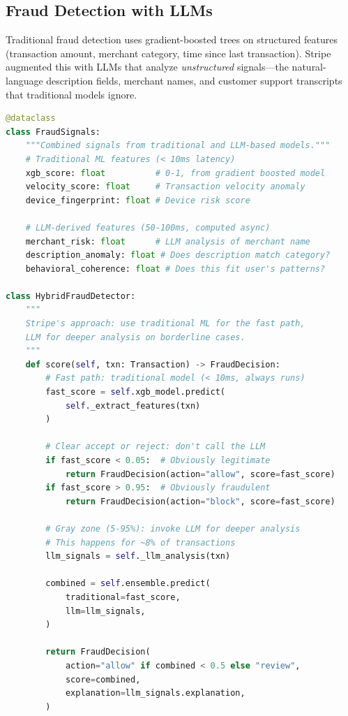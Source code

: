 \subsection{Fraud Detection with LLMs}

Traditional fraud detection uses gradient-boosted trees on structured features (transaction amount, merchant category, time since last transaction). Stripe augmented this with LLMs that analyze \emph{unstructured} signals---the natural-language description fields, merchant names, and customer support transcripts that traditional models ignore.

\begin{lstlisting}[language=Python, caption={Hybrid fraud scoring: traditional ML + LLM signals}]
@dataclass
class FraudSignals:
    """Combined signals from traditional and LLM-based models."""
    # Traditional ML features (< 10ms latency)
    xgb_score: float          # 0-1, from gradient boosted model
    velocity_score: float     # Transaction velocity anomaly
    device_fingerprint: float # Device risk score
    
    # LLM-derived features (50-100ms, computed async)
    merchant_risk: float      # LLM analysis of merchant name
    description_anomaly: float # Does description match category?
    behavioral_coherence: float # Does this fit user's patterns?

class HybridFraudDetector:
    """
    Stripe's approach: use traditional ML for the fast path,
    LLM for deeper analysis on borderline cases.
    """
    def score(self, txn: Transaction) -> FraudDecision:
        # Fast path: traditional model (< 10ms, always runs)
        fast_score = self.xgb_model.predict(
            self._extract_features(txn)
        )
        
        # Clear accept or reject: don't call the LLM
        if fast_score < 0.05:  # Obviously legitimate
            return FraudDecision(action="allow", score=fast_score)
        if fast_score > 0.95:  # Obviously fraudulent
            return FraudDecision(action="block", score=fast_score)
        
        # Gray zone (5-95%): invoke LLM for deeper analysis
        # This happens for ~8% of transactions
        llm_signals = self._llm_analysis(txn)
        
        combined = self.ensemble.predict(
            traditional=fast_score,
            llm=llm_signals,
        )
        
        return FraudDecision(
            action="allow" if combined < 0.5 else "review",
            score=combined,
            explanation=llm_signals.explanation,
        )
\end{lstlisting}

